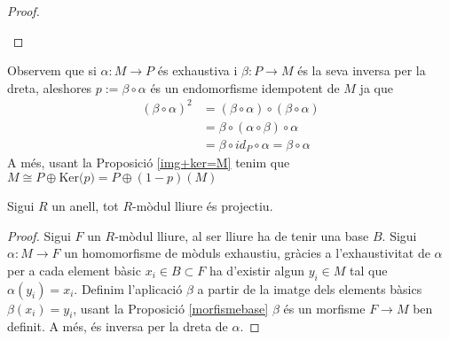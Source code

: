 \begin{proof}
\begin{figure}[!htb]
\endminipage\hfill
{}%
\begin{center}
\caption{} \label{fbij}
\end{center}

\endminipage
\end{figure}

\end{proof}


\begin{obs}\label{sumasplit}Observem que si $\alpha : M\rightarrow P$ és exhaustiva i $\beta:P\rightarrow M$ és la seva inversa per la dreta, aleshores $p:=\beta \circ \alpha$ és un endomorfisme idempotent de $M$ ja que 
\begin{equation} 
\begin{split}
(\beta \circ \alpha)^2 & = (\beta \circ \alpha) \circ (\beta \circ \alpha) \\
 & = \beta \circ (\alpha \circ \beta) \circ \alpha \\
 &= \beta \circ id_P \circ \alpha  = \beta \circ \alpha
\end{split}
\end{equation}
A més, usant la Proposició \ref{img+ker=M} tenim que $M \cong P \oplus \text{Ker($p$)} = P \oplus (1-p)(M) $
\end{obs}

\begin{lemma}
 Sigui $R$ un anell, tot $R$-mòdul lliure és projectiu. 
\end{lemma}
\begin{proof} Sigui $F$ un $R$-mòdul lliure, al ser lliure ha de tenir una base $B$. Sigui $\alpha: M \rightarrow F$ un homomorfisme de mòduls exhaustiu,  gràcies a l'exhaustivitat de $\alpha$ per a cada element bàsic $x_i\in B \subset F$ ha d'existir algun $y_i\in M$ tal que $\alpha(y_i)=x_i$. Definim l'aplicació $\beta$ a partir de la imatge dels elements bàsics $\beta(x_i)=y_i$, usant la Proposició \ref{morfismebase} $\beta$ és un morfisme $F\rightarrow M$ ben definit. A més, és inversa per la dreta de $\alpha$.
\end{proof}

